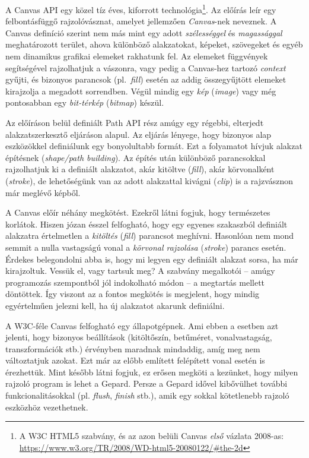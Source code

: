 \documentclass[12pt]{report}
\theoremstyle{definition}
\newcommand{\inenglish}[1]{\textsl{#1}}
\newcommand{\func}[1]{{\textsl{#1}}}
\begin{document}
A Canvas API egy közel tíz éves, kiforrott technológia\footnote {A W3C HTML5
szabvány, és az azon belüli Canvas \emph{első} vázlata 2008-as:\\
{\footnotesize\url{https://www.w3.org/TR/2008/WD-html5-20080122/\#the-2d}}}.
Az előírás leír egy felbontásfüggő rajzolóvásznat, amelyet jellemzően
\emph{Canvas}-nek neveznek. A Canvas definíció szerint nem más mint egy adott
\emph{szélességgel} és \emph{magassággal} meghatározott terület, ahova
különböző alakzatokat, képeket, szövegeket és egyéb nem dinamikus grafikai
elemeket rakhatunk fel. Az elemeket függvények segítségével rajzolhatjuk a
vászonra, vagy pedig a Canvas-hez tartozó \emph{context} gyűjti, és bizonyos
parancsok (pl.~\emph{fill}) esetén az addig összegyűjtött elemeket kirajzolja a
megadott sorrendben. Végül mindig egy \emph{kép} (\inenglish{image}) vagy még
pontosabban egy \emph{bit-térkép} (\inenglish{bitmap}) készül.

Az előíráson belül definiált Path API rész amúgy egy régebbi, elterjedt
alakzatszerkesztő eljáráson alapul. Az eljárás lényege, hogy bizonyos alap
eszközökkel definiálunk egy bonyolultabb formát. Ezt a folyamatot hívjuk
alakzat építésnek (\inenglish{shape/path building}). Az építés után különböző
parancsokkal rajzolhatjuk ki a definiált alakzatot, akár kitöltve
(\emph{fill}), akár körvonalként (\emph{stroke}), de lehetőségünk van az adott
alakzattal kivágni (\emph{clip}) is a rajzvásznon már meglévő képből.

A Canvas előír néhány megkötést. Ezekről látni fogjuk, hogy természetes
korlátok. Hiszen józan ésszel felfogható, hogy egy egyenes szakaszból definiált
alakzatra értelmetlen a \emph{kitöltés} (\func{fill}) parancsot meghívni.
Hasonlóan nem mond semmit a nulla vastagságú vonal a \emph{körvonal rajzolása}
(\func{stroke}) parancs esetén. Érdekes belegondolni abba is, hogy mi legyen
egy definiált alakzat sorsa, ha már kirajzoltuk. Vessük el, vagy tartsuk meg? A
szabvány megalkotói -- amúgy programozás szempontból jól indokolható módon --
a megtartás mellett döntöttek. Így viszont az a fontos megkötés is megjelent,
hogy mindig egyértelműen jelezni kell, ha új alakzatot akarunk definiálni.

A W3C-féle Canvas felfogható egy állapotgépnek. Ami ebben a esetben azt
jelenti, hogy bizonyos beállítások (kitöltőszín, betűméret, vonalvastagság,
transzformációk stb.) érvényben maradnak mindaddig, amíg meg nem változtatjuk
azokat. Ezt már az előbb említett felépített vonal esetén is érezhettük. Mint
később látni fogjuk, ez erősen megköti a kezünket, hogy milyen rajzoló program
is lehet a Gepard. Persze a Gepard idővel kibővülhet további
funkcionalitásokkal (pl. \emph{flush}, \emph{finish} stb.), amik egy sokkal
kötetlenebb rajzoló eszközhöz vezethetnek.
\end{document}
